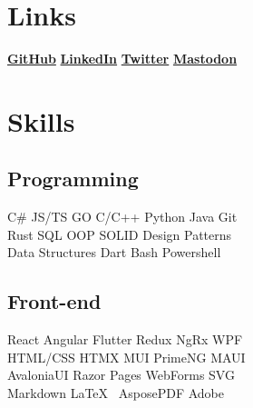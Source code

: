 \documentclass[letterpaper]{cv_12} %
\begin{document}
\begin{minipage}[t]{0.39\textwidth}%


    \section{Links}

    \href{https://github.com/foontzoot}{\bf GitHub} \textbullet{}
    \href{https://www.linkedin.com/in/sinisa-petkovic-b704034/}{\bf LinkedIn} \textbullet{}
    \href{https://twitter.com/SinisaPetkovic}{\bf Twitter} \textbullet{}
    \href{https://c.im/@foontzoot}{\bf Mastodon}

    \sectionspace%


    \section{Skills}

    \subsection{Programming}

    C\# \textbullet{} JS/TS \textbullet{} GO \textbullet{} C/C++
    \textbullet{} Python \textbullet{} Java \textbullet{} Git\\
    Rust \textbullet{} SQL \textbullet{} OOP \textbullet{} SOLID
    \textbullet{} Design Patterns\\
    Data Structures \textbullet{} Dart \textbullet{} Bash 
    \textbullet{} Powershell

    \sectionspace%

    \subsection{Front-end}

    React \textbullet{} Angular \textbullet{} Flutter \textbullet{} Redux
    \textbullet{} NgRx \textbullet{} WPF\\
    HTML/CSS \textbullet{} HTMX \textbullet{} MUI \textbullet{} PrimeNG
    \textbullet{} MAUI\\
    AvaloniaUI \textbullet{} Razor Pages \textbullet{} WebForms
    \textbullet{} SVG\\
    Markdown \textbullet{} \LaTeX\ \textbullet{} AsposePDF \textbullet{}
    Adobe


\end{minipage}
\end{document}
